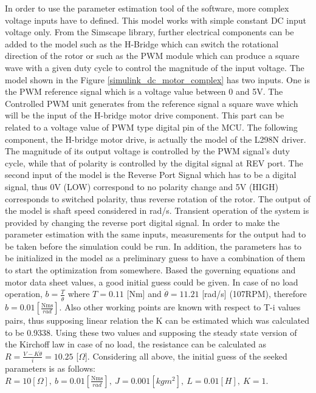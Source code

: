 \documentclass[12pt,english]{article}
\begin{document}
In order to use the parameter estimation tool of the software, more complex voltage inputs have to defined. This model works with simple constant DC input voltage only. From the Simscape library, further electrical components can be added to the model such as the H-Bridge which can switch the rotational direction of the rotor or such as the PWM module which can produce a square wave with a given duty cycle to control the magnitude of the input voltage. The model shown in the Figure \ref{simulink_dc_motor_complex} has two inputs. One is the PWM reference signal which is a voltage value between 0 and 5V. The Controlled PWM unit generates from the reference signal a square wave which will be the input of the H-bridge motor drive component. This part can be related to a voltage value of PWM type digital pin of the MCU. The following component, the H-bridge motor drive, is actually the model of the L298N driver. The magnitude of its output voltage is controlled by the PWM signal's duty cycle, while that of polarity is controlled by the digital signal at REV port. The second input of the model is the Reverse Port Signal which has to be a digital signal, thus 0V (LOW) correspond to no polarity change and 5V (HIGH) corresponds to switched polarity, thus reverse rotation of the rotor. The output of the model is shaft speed considered in rad/s. Transient operation of the system is provided by changing the reverse port digital signal. In order to make the parameter estimation with the same inputs, measurements for the output had to be taken before the simulation could be run. In addition, the parameters has to be initialized in the model as a preliminary guess to have a combination of them to start the optimization from somewhere. Based the governing equations and motor data sheet values, a good initial guess could be given. In case of no load operation, $b=\frac{T}{\dot \theta}$ where $T=0.11$ [Nm] and $\dot \theta =11.21$ [rad/s] (107RPM), therefore $b=0.01[\frac{\text{Nms}}{rad}]$. Also other working points are known with respect to T-i values pairs, thus supposing linear relation the K can be estimated which was calculated to be 0.9338. Using these two values and supposing the steady state version of the Kirchoff law in case of no load, the resistance can be calculated as $R=\frac{V-K \dot \theta}{i} = 10.25$ [$\Omega$].
Considering all above, the initial guess of the seeked parameters is as follows:
$R=10[\Omega],~b=0.01[\frac{\text{Nms}}{rad}],~J=0.001[kgm^2],~L=0.01[H],~K=1$.
\end{document}
